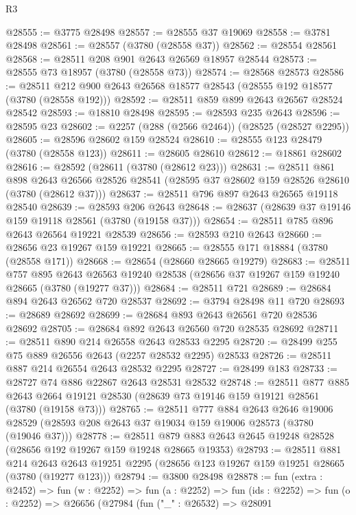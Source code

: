 \begin{lexlean}{R3}
\begin{coremodule}
@28555 := @3775 @28498
@28557 := @28555 @37 @19069
@28558 := @3781 @28498
@28561 := @28557 (@3780 (@28558 @37))
@28562 := @28554 @28561
@28568 := @28511 @208 @901 @2643 @26569 @18957 @28544
@28573 := @28555 @73 @18957 (@3780 (@28558 @73))
@28574 := @28568 @28573
@28586 := @28511 @212 @900 @2643 @26568 @18577 @28543 (@28555 @192 @18577 (@3780 (@28558 @192)))
@28592 := @28511 @859 @899 @2643 @26567 @28524 @28542
@28593 := @18810 @28498
@28595 := @28593 @235 @2643
@28596 := @28595 @23
@28602 := @2257 (@288 (@2566 @2464)) (@28525 (@28527 @2295))
@28605 := @28596 @28602 @159 @28524
@28610 := @28555 @123 @28479 (@3780 (@28558 @123))
@28611 := @28605 @28610
@28612 := @18861 @28602
@28616 := @28592 (@28611 (@3780 (@28612 @23)))
@28631 := @28511
    @861
    @898
    @2643
    @26566
    @28526
    @28541
    (@28595 @37 @28602 @159 @28526 @28610 (@3780 (@28612 @37)))
@28637 := @28511 @796 @897 @2643 @26565 @19118 @28540
@28639 := @28593 @206 @2643
@28648 := @28637 (@28639 @37 @19146 @159 @19118 @28561 (@3780 (@19158 @37)))
@28654 := @28511 @785 @896 @2643 @26564 @19221 @28539
@28656 := @28593 @210 @2643
@28660 := @28656 @23 @19267 @159 @19221
@28665 := @28555 @171 @18884 (@3780 (@28558 @171))
@28668 := @28654 (@28660 @28665 @19279)
@28683 := @28511
    @757
    @895
    @2643
    @26563
    @19240
    @28538
    (@28656 @37 @19267 @159 @19240 @28665 (@3780 (@19277 @37)))
@28684 := @28511 @721
@28689 := @28684 @894 @2643 @26562 @720 @28537
@28692 := @3794 @28498 @11 @720
@28693 := @28689 @28692
@28699 := @28684 @893 @2643 @26561 @720 @28536 @28692
@28705 := @28684 @892 @2643 @26560 @720 @28535 @28692
@28711 := @28511 @890 @214 @26558 @2643 @28533 @2295
@28720 := @28499 @255 @75 @889 @26556 @2643 (@2257 @28532 @2295) @28533
@28726 := @28511 @887 @214 @26554 @2643 @28532 @2295
@28727 := @28499 @183
@28733 := @28727 @74 @886 @22867 @2643 @28531 @28532
@28748 := @28511
    @877
    @885
    @2643
    @2664
    @19121
    @28530
    (@28639 @73 @19146 @159 @19121 @28561 (@3780 (@19158 @73)))
@28765 := @28511
    @777
    @884
    @2643
    @2646
    @19006
    @28529
    (@28593 @208 @2643 @37 @19034 @159 @19006 @28573 (@3780 (@19046 @37)))
@28778 := @28511 @879 @883 @2643 @2645 @19248 @28528 (@28656 @192 @19267 @159 @19248 @28665 @19353)
@28793 := @28511
    @881
    @214
    @2643
    @2643
    @19251
    @2295
    (@28656 @123 @19267 @159 @19251 @28665 (@3780 (@19277 @123)))
@28794 := @3800 @28498
@28878 := fun (extra : @2452) =>
  fun (w : @2252) =>
  fun (a : @2252) =>
  fun (ids : @2252) =>
  fun (o : @2252) =>
  @26656
    (@27984
      (fun ("_" : @26532) =>
      @28091

\end{coremodule}
\end{lexlean}
